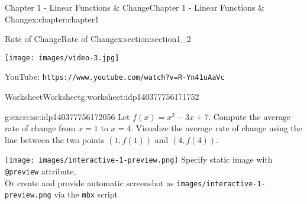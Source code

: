 \documentclass[oneside,10pt,]{book}
\newcommand{\mono}[1]{\texttt{#1}}
\newlength{\qrsize}
\newlength{\previewwidth}
\begin{document}
\begin{chapterptx}{Chapter 1 - Linear Functions \& Change}{}{Chapter 1 - Linear Functions \& Change}{}{}{x:chapter:chapter1}
%
\begin{sectionptx}{Rate of Change}{}{Rate of Change}{}{}{x:section:section1_2}
\setlength{\qrsize}{9em}
\setlength{\previewwidth}{\linewidth}
\addtolength{\previewwidth}{-\qrsize}
\begin{tcbraster}[raster columns=2, raster column skip=1pt, raster halign=center, raster force size=false, raster left skip=0pt, raster right skip=0pt]%
\begin{tcolorbox}[previewstyle, width=\previewwidth]%
\texttt{[image: images/video-3.jpg]}%
\end{tcolorbox}%
\begin{tcolorbox}[qrstyle]%
{\hypersetup{urlcolor=black}}%
\end{tcolorbox}%
\begin{tcolorbox}[captionstyle]%
\small YouTube: \mono{https://www.youtube.com/watch?v=R-Yn41uAaVc}\end{tcolorbox}%
\end{tcbraster}%
%
%
\typeout{************************************************}
\typeout{************************************************}
%
\begin{worksheet-subsection}{Worksheet}{}{Worksheet}{}{}{g:worksheet:idp140377756171752}
\begin{divisionexercise}{1}{}{}{g:exercise:idp140377756172056}%
Let \(f(x) = x^2-3x+7\). Compute the average rate of change from \(x=1\) to \(x=4\). Visualize the average rate of change using the line between the two points \((1,f(1))\) and \((4,f(4))\).%
\par
\setlength{\qrsize}{9em}
\setlength{\previewwidth}{\linewidth}
\addtolength{\previewwidth}{-\qrsize}
\begin{tcbraster}[raster columns=2, raster column skip=1pt, raster halign=center, raster force size=false, raster left skip=0pt, raster right skip=0pt]%
\begin{tcolorbox}[previewstyle, width=\previewwidth]%
%
{\texttt{[image: images/interactive-1-preview.png]}}%
{\small{}Specify static image with \mono{@preview} attribute,\\Or create and provide automatic screenshot as \mono{images/interactive-1-preview.png} via the \mono{mbx} script}%
\end{tcolorbox}%

\end{tcbraster}
\end{divisionexercise}
\end{worksheet-subsection}
\end{sectionptx}
\end{chapterptx}
\end{document}
